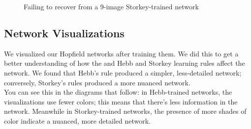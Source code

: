 \documentclass[11pt]{article}
\begin{document}
\begin{figure}[h!]
	\centering
	\qquad
	\caption{Failing to recover from a 9-image Storkey-trained network}
\end{figure}

\pagebreak

\subsection{Network Visualizations}\label{network-visualizations}

We visualized our Hopfield networks after training them. We did this to
get a better understanding of how the and Hebb and Storkey learning
rules affect the network. We found that Hebb's rule produced a simpler,
less-detailed network; conversely, Storkey's rules produced a more nuanced network.
\\

You can see this in the diagrams that follow: in Hebb-trained networks,
the visualizations use fewer colors; this means that there's less
information in the network. Meanwhile in Storkey-trained networks, the
presence of more shades of color indicate a nuanced, more detailed
network.
\\
\end{document}
